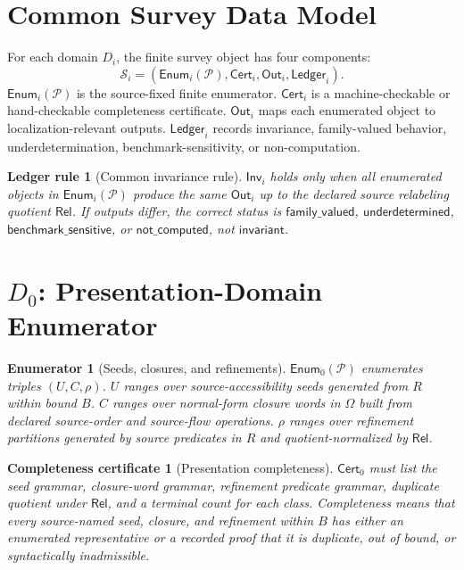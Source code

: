 \documentclass[11pt]{article}
\newcommand{\Pack}{\mathcal{P}}
\newcommand{\Enum}{\mathsf{Enum}}
\newcommand{\Cert}{\mathsf{Cert}}
\newcommand{\Out}{\mathsf{Out}}
\newcommand{\Ledger}{\mathsf{Ledger}}
\newcommand{\Inv}{\mathsf{Inv}}
\newcommand{\Rel}{\mathsf{Rel}}
\newtheorem{enumerator}{Enumerator}
\newtheorem{certificate}{Completeness certificate}
\newtheorem{ledger}{Ledger rule}
\begin{document}
\section{Common Survey Data Model}

For each domain \(D_i\), the finite survey object has four components:
\[
\mathcal{S}_i=(\Enum_i(\Pack),\Cert_i,\Out_i,\Ledger_i).
\]
\(\Enum_i(\Pack)\) is the source-fixed finite enumerator. \(\Cert_i\) is a
machine-checkable or hand-checkable completeness certificate. \(\Out_i\)
maps each enumerated object to localization-relevant outputs. \(\Ledger_i\)
records invariance, family-valued behavior, underdetermination,
benchmark-sensitivity, or non-computation.

\begin{ledger}[Common invariance rule]
\(\Inv_i\) holds only when all enumerated objects in \(\Enum_i(\Pack)\)
produce the same \(\Out_i\) up to the declared source relabeling quotient
\(\Rel\). If outputs differ, the correct status is
\(\mathsf{family\_valued}\), \(\mathsf{underdetermined}\),
\(\mathsf{benchmark\_sensitive}\), or \(\mathsf{not\_computed}\), not
\(\mathsf{invariant}\).
\end{ledger}

\section{\texorpdfstring{\(D_0\)}{D0}: Presentation-Domain Enumerator}

\begin{enumerator}[Seeds, closures, and refinements]
\(\Enum_0(\Pack)\) enumerates triples \((U,C,\rho)\). \(U\) ranges over
source-accessibility seeds generated from \(R\) within bound \(B\). \(C\)
ranges over normal-form closure words in \(\Omega\) built from declared
source-order and source-flow operations. \(\rho\) ranges over refinement
partitions generated by source predicates in \(R\) and quotient-normalized by
\(\Rel\).
\end{enumerator}

\begin{certificate}[Presentation completeness]
\(\Cert_0\) must list the seed grammar, closure-word grammar, refinement
predicate grammar, duplicate quotient under \(\Rel\), and a terminal count
for each class. Completeness means that every source-named seed, closure,
and refinement within \(B\) has either an enumerated representative or a
recorded proof that it is duplicate, out of bound, or syntactically
inadmissible.
\end{certificate}
\end{document}

